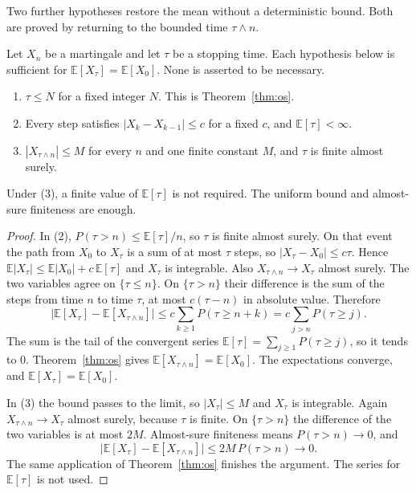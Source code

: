 Two further hypotheses restore the mean without a deterministic bound. Both are proved by returning to the bounded time $\tau\wedge n$.

\begin{theorem}\label{thm:os2}
Let $X_n$ be a martingale and let $\tau$ be a stopping time. Each hypothesis below is sufficient for $\mathbb E[X_\tau]=\mathbb E[X_0]$. None is asserted to be necessary.
\begin{enumerate}
\item $\tau\le N$ for a fixed integer $N$. This is Theorem~\ref{thm:os}.
\item Every step satisfies $|X_k-X_{k-1}|\le c$ for a fixed $c$, and $\mathbb E[\tau]<\infty$.
\item $|X_{\tau\wedge n}|\le M$ for every $n$ and one finite constant $M$, and $\tau$ is finite almost surely.
\end{enumerate}
Under (3), a finite value of $\mathbb E[\tau]$ is not required. The uniform bound and almost-sure finiteness are enough.
\end{theorem}
\begin{proof}
In (2), $P(\tau>n)\le\mathbb E[\tau]/n$, so $\tau$ is finite almost surely. On that event the path from $X_0$ to $X_\tau$ is a sum of at most $\tau$ steps, so $|X_\tau-X_0|\le c\tau$. Hence $\mathbb E|X_\tau|\le\mathbb E|X_0|+c\,\mathbb E[\tau]$ and $X_\tau$ is integrable. Also $X_{\tau\wedge n}\to X_\tau$ almost surely. The two variables agree on $\{\tau\le n\}$. On $\{\tau>n\}$ their difference is the sum of the steps from time $n$ to time $\tau$, at most $c(\tau-n)$ in absolute value. Therefore
\[
 \bigl|\mathbb E[X_\tau]-\mathbb E[X_{\tau\wedge n}]\bigr|
 \le c\sum_{k\ge1}P(\tau\ge n+k)
 =c\sum_{j>n}P(\tau\ge j).
\]
The sum is the tail of the convergent series $\mathbb E[\tau]=\sum_{j\ge1}P(\tau\ge j)$, so it tends to $0$. Theorem~\ref{thm:os} gives $\mathbb E[X_{\tau\wedge n}]=\mathbb E[X_0]$. The expectations converge, and $\mathbb E[X_\tau]=\mathbb E[X_0]$.

In (3) the bound passes to the limit, so $|X_\tau|\le M$ and $X_\tau$ is integrable. Again $X_{\tau\wedge n}\to X_\tau$ almost surely, because $\tau$ is finite. On $\{\tau>n\}$ the difference of the two variables is at most $2M$. Almost-sure finiteness means $P(\tau>n)\to0$, and
\[
 \bigl|\mathbb E[X_\tau]-\mathbb E[X_{\tau\wedge n}]\bigr|\le 2M\,P(\tau>n)\to0.
\]
The same application of Theorem~\ref{thm:os} finishes the argument. The series for $\mathbb E[\tau]$ is not used.
\end{proof}

